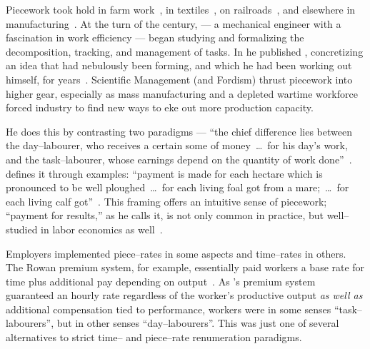 \documentclass[trackingWork]{subfiles}
\begin{document}
Piecework took hold in farm work~\cite{hughRaynbirdTaskWork}, %
in textiles~\cite{restructuringPieceworkBaker,riisOtherSideLives},
on railroads~\cite{Brown01041990}, and 
elsewhere in manufacturing~\cite{10.2307/3827491}.
At the turn of the  century, \citeauthor{taylor1914principles}
--- a mechanical engineer with a fascination in work efficiency ---
began studying and formalizing the decomposition, tracking, and management of tasks.
In \citeyear{taylor1914principles} he published ,
concretizing an idea that had nebulously been forming,
and which he had been working out himself, for years~\cite{taylor1914principles}.
Scientific Management (and Fordism) thrust piecework into higher gear, especially as
mass manufacturing and
a depleted wartime workforce forced industry to find new ways to eke out more production capacity.


He does this by contrasting two paradigms ---
``the chief difference lies between the day--labourer,
who receives a certain some of money~\dots~for his day's work,
and the task--labourer, whose earnings depend on the quantity of work done''~\cite{hughRaynbirdTaskWork}.
\citeauthor{10.2307/2338394} defines it through examples:
``payment is made for each hectare which is pronounced to be well ploughed~\dots~for each living foal got from a mare;~\dots~for each living calf got''~\cite{10.2307/2338394}.
This framing offers an intuitive sense of piecework;
``payment for results,'' as he calls it,
is not only common in practice, but
well--studied in labor economics as well~\cite{Figlio2007901,weitzman1976new,10.2307/3003414,BJIR:BJIR038}.

Employers implemented piece--rates in some aspects and
time--rates in others.
The Rowan premium system, for example,
essentially paid workers
a base rate for time plus
additional pay depending on output~\cite{rowan1901premium}.
As \citeauthor{rowan1901premium}'s premium system guaranteed an hourly rate
regardless of the worker's productive output
\textit{as well as} additional compensation tied to performance,
workers were
in some senses ``task--labourers'', but
in other senses ``day--labourers''.
This was just one of several alternatives to strict time-- and piece--rate renumeration paradigms.
\end{document}
